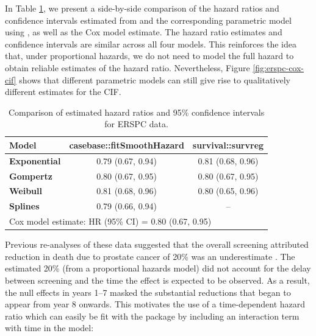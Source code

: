 In Table \ref{tab:print-erspc-estimates}, we present a side-by-side
comparison of the hazard ratios and confidence intervals estimated from
 and the corresponding parametric model using
, as well as the Cox model estimate. The hazard
ratio estimates and confidence intervals are similar across all four
models. This reinforces the idea that, under proportional hazards, we do
not need to model the full hazard to obtain reliable estimates of the
hazard ratio. Nevertheless, Figure \ref{fig:erspc-cox-cif} shows that
different parametric models can still give rise to qualitatively
different estimates for the CIF.

\begin{Schunk}
\begin{table}

\caption{\label{tab:print-erspc-estimates}Comparison of estimated hazard ratios and 95\% confidence intervals for ERSPC data.}
\centering
\begin{tabular}[t]{>{}lcc}
\toprule
Model & casebase::fitSmoothHazard & survival::survreg\\
\midrule
\textbf{Exponential} & 0.79 (0.67, 0.94) & 0.81 (0.68, 0.96)\\
\cmidrule{1-3}
\textbf{Gompertz} & 0.80 (0.67, 0.95) & 0.80 (0.67, 0.95)\\
\cmidrule{1-3}
\textbf{Weibull} & 0.81 (0.68, 0.96) & 0.80 (0.65, 0.96)\\
\cmidrule{1-3}
\textbf{Splines} & 0.79 (0.66, 0.94) & --\\
\bottomrule
\multicolumn{3}{l}{\rule{0pt}{1em}Cox model estimate: HR (95\% CI) = 0.80 (0.67, 0.95)}\\
\end{tabular}
\end{table}

\end{Schunk}

Previous re-analyses of these data suggested that the overall screening
attributed reduction in death due to prostate cancer of 20\% was an
underestimate \citep{hanley2010mortality}. The estimated 20\% (from a
proportional hazards model) did not account for the delay between
screening and the time the effect is expected to be observed. As a
result, the null effects in years 1--7 masked the substantial reductions
that began to appear from year 8 onwards. This motivates the use of a
time-dependent hazard ratio which can easily be fit with the
 package by including an interaction term with time in the
model:

